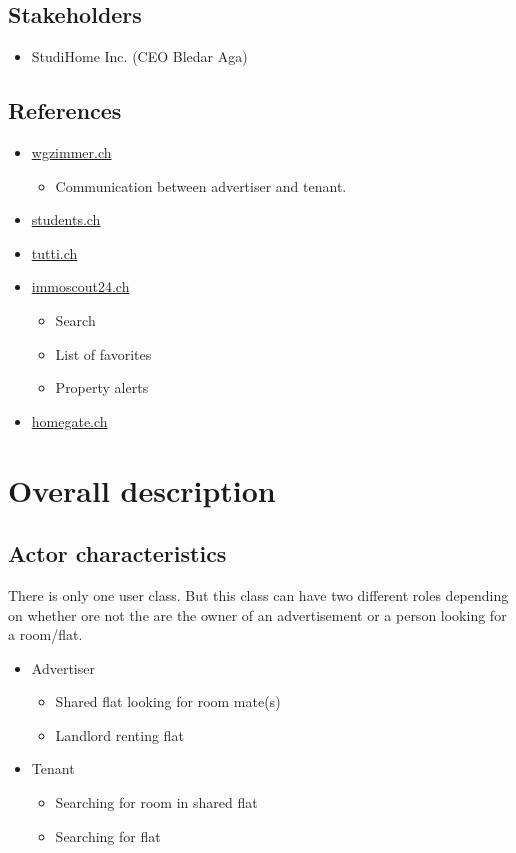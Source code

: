 \documentclass[a4paper,11pt]{article}
\begin{document}
\subsection*{Stakeholders}
\begin{itemize}
  \item StudiHome Inc. (CEO Bledar Aga)
\end{itemize}

\subsection*{References}
\begin{itemize}
  \item \href{www.wgzimmer.ch}{wgzimmer.ch}
  \begin{itemize}
    \item Communication between advertiser and tenant.
  \end{itemize}
  \item \href{http://www.students.ch/wohnen}{students.ch}
  \item \href{http://www.tutti.ch/ganze-schweiz/immobilien/wg-zimmer}{tutti.ch}
  \item \href{http://www.immoscout24.ch/}{immoscout24.ch}
  \begin{itemize}
    \item Search
    \item List of favorites
    \item Property alerts
  \end{itemize}
  \item \href{http://www.homegate.ch/}{homegate.ch}
\end{itemize}

\section{Overall description}
\subsection*{Actor characteristics}
There is only one user class. But this class can have two different roles depending on whether ore not the are the owner of an advertisement or a person looking for a room/flat.
\begin{itemize}
  \item Advertiser
    \begin{itemize}
      \item Shared flat looking for room mate(s)
      \item Landlord renting flat
    \end{itemize}
  \item Tenant
  \begin{itemize}
    \item Searching for room in shared flat
    \item Searching for flat
  \end{itemize}
\end{itemize}
\end{document}
